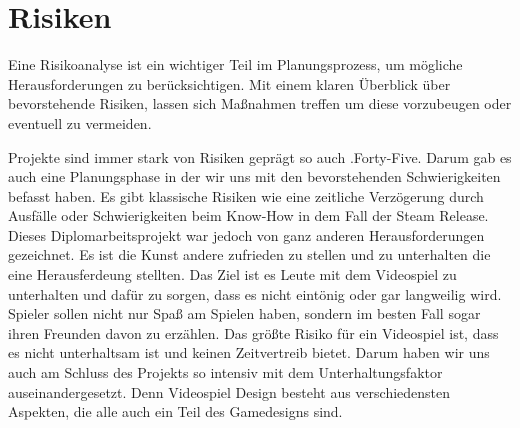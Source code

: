 
\section{Risiken}\label{sec:risiken}

\renewcommand{\kapitelautor}{Autor: Irgendwer} %
%
Eine Risikoanalyse ist ein wichtiger Teil im Planungsprozess, um mögliche Herausforderungen zu berücksichtigen.
Mit einem klaren Überblick über bevorstehende Risiken, lassen sich Maßnahmen treffen um diese vorzubeugen oder eventuell zu vermeiden.\cite{AsanaRisiken}

Projekte sind immer stark von Risiken geprägt so auch .Forty-Five. Darum gab es auch eine Planungsphase in der wir uns mit den bevorstehenden Schwierigkeiten befasst haben.
Es gibt klassische Risiken wie eine zeitliche Verzögerung durch Ausfälle oder Schwierigkeiten beim Know-How in dem Fall der Steam Release.
Dieses Diplomarbeitsprojekt war jedoch von ganz anderen Herausforderungen gezeichnet. Es ist die Kunst andere zufrieden zu stellen und zu unterhalten die eine Herausferdeung stellten.
Das Ziel ist es Leute mit dem Videospiel zu unterhalten und dafür zu sorgen, dass es nicht eintönig oder gar langweilig wird.
Spieler sollen nicht nur Spaß am Spielen haben, sondern im besten Fall sogar ihren Freunden davon zu erzählen.
Das größte Risiko für ein Videospiel ist, dass es nicht unterhaltsam ist und keinen Zeitvertreib bietet. Darum haben wir uns auch am Schluss des Projekts so intensiv mit dem Unterhaltungsfaktor auseinandergesetzt.
Denn Videospiel Design besteht aus verschiedensten Aspekten, die alle auch ein Teil des Gamedesigns sind.
%

\renewcommand{\kapitelautor}{}
